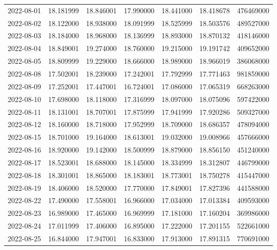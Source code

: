 \begin{tabular}{lrrrrrr}
2022-08-01 &   18.181999 &   18.846001 &   17.990000 &   18.441000 &   18.418678 &   476469000 \\
2022-08-02 &   18.122000 &   18.938000 &   18.091999 &   18.525999 &   18.503576 &   489527000 \\
2022-08-03 &   18.184000 &   18.968000 &   18.136999 &   18.893000 &   18.870132 &   418146000 \\
2022-08-04 &   18.849001 &   19.274000 &   18.760000 &   19.215000 &   19.191742 &   409652000 \\
2022-08-05 &   18.809999 &   19.229000 &   18.666000 &   18.989000 &   18.966019 &   386068000 \\
2022-08-08 &   17.502001 &   18.239000 &   17.242001 &   17.792999 &   17.771463 &   981859000 \\
2022-08-09 &   17.252001 &   17.447001 &   16.724001 &   17.086000 &   17.065319 &   668263000 \\
2022-08-10 &   17.698000 &   18.118000 &   17.316999 &   18.097000 &   18.075096 &   597422000 \\
2022-08-11 &   18.131001 &   18.707001 &   17.875999 &   17.941999 &   17.920286 &   509327000 \\
2022-08-12 &   18.160000 &   18.718000 &   17.952999 &   18.709000 &   18.686357 &   478094000 \\
2022-08-15 &   18.701000 &   19.164000 &   18.613001 &   19.032000 &   19.008966 &   457666000 \\
2022-08-16 &   18.920000 &   19.142000 &   18.500999 &   18.879000 &   18.856150 &   451240000 \\
2022-08-17 &   18.523001 &   18.688000 &   18.145000 &   18.334999 &   18.312807 &   446799000 \\
2022-08-18 &   18.301001 &   18.865000 &   18.183001 &   18.773001 &   18.750278 &   415447000 \\
2022-08-19 &   18.406000 &   18.520000 &   17.770000 &   17.849001 &   17.827396 &   441588000 \\
2022-08-22 &   17.490000 &   17.558001 &   16.966000 &   17.034000 &   17.013384 &   409593000 \\
2022-08-23 &   16.989000 &   17.465000 &   16.969999 &   17.181000 &   17.160204 &   369986000 \\
2022-08-24 &   17.011999 &   17.406000 &   16.895000 &   17.222000 &   17.201155 &   522661000 \\
2022-08-25 &   16.844000 &   17.947001 &   16.833000 &   17.913000 &   17.891315 &   770691000 \\

\end{tabular}
